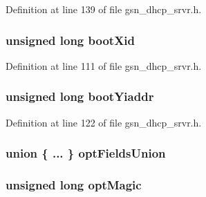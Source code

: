 Definition at line 139 of file gsn\_\-dhcp\_\-srvr.h.

\hypertarget{a00046_a7c30634c6eaa55ec623c235e8019e2c4}{
\subsubsection[{bootXid}]{\setlength{\rightskip}{0pt plus 5cm}unsigned long {\bf bootXid}}}
\label{a00046_a7c30634c6eaa55ec623c235e8019e2c4}


Definition at line 111 of file gsn\_\-dhcp\_\-srvr.h.

\hypertarget{a00046_aa41ec004ca53a19130117115df4490c1}{
\subsubsection[{bootYiaddr}]{\setlength{\rightskip}{0pt plus 5cm}unsigned long {\bf bootYiaddr}}}
\label{a00046_aa41ec004ca53a19130117115df4490c1}


Definition at line 122 of file gsn\_\-dhcp\_\-srvr.h.

\hypertarget{a00046_ade6ea719c201c8a3928fffa4f47f52c4}{
\subsubsection[{optFieldsUnion}]{\setlength{\rightskip}{0pt plus 5cm}union \{ ... \}   {\bf optFieldsUnion}}}
\label{a00046_ade6ea719c201c8a3928fffa4f47f52c4}
\hypertarget{a00046_abae004f76576c98d26dc7265cb169cb7}{
\subsubsection[{optMagic}]{\setlength{\rightskip}{0pt plus 5cm}unsigned long {\bf optMagic}}}
\label{a00046_abae004f76576c98d26dc7265cb169cb7}


